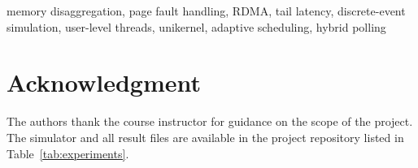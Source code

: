 \documentclass[conference]{IEEEtran}
\begin{document}
\begin{IEEEkeywords}
memory disaggregation, page fault handling, RDMA, tail latency, discrete-event simulation, user-level threads, unikernel, adaptive scheduling, hybrid polling
\end{IEEEkeywords}














\section*{Acknowledgment}
The authors thank the course instructor for guidance on the scope of the project. The simulator and all result files are available in the project repository listed in Table~\ref{tab:experiments}.
\end{document}
